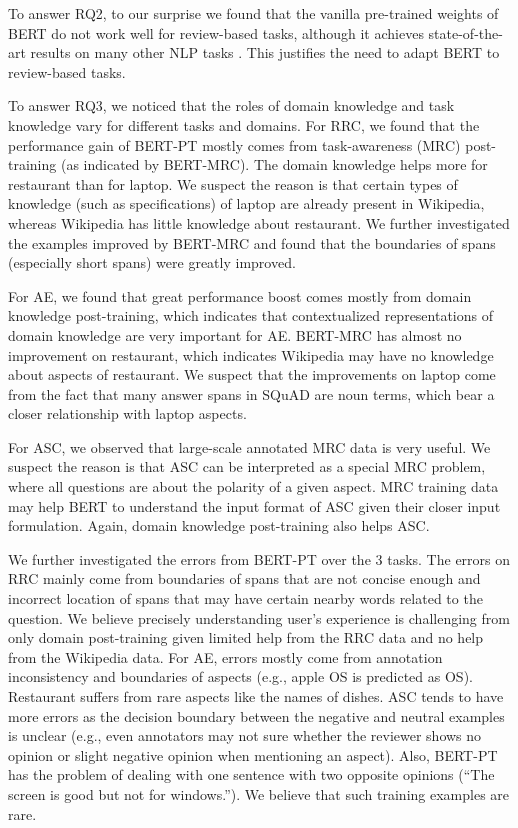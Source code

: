 \documentclass[11pt,a4paper]{article}
\begin{document}
To answer RQ2, to our surprise we found that the vanilla pre-trained weights of BERT do not work well for review-based tasks, although it achieves state-of-the-art results on many other NLP tasks \cite{devlin2018bert}.
This justifies the need to adapt BERT to review-based tasks.

To answer RQ3, we noticed that the roles of domain knowledge and task knowledge vary for different tasks and domains.
For RRC, we found that the performance gain of BERT-PT mostly comes from task-awareness (MRC) post-training (as indicated by BERT-MRC).
The domain knowledge helps more for restaurant than for laptop.
We suspect the reason is that certain types of knowledge (such as specifications) of laptop are already present in Wikipedia, whereas Wikipedia has little knowledge about restaurant.
We further investigated the examples improved by BERT-MRC and found that the boundaries of spans (especially short spans) were greatly improved. 

For AE,
we found that great performance boost comes mostly from domain knowledge post-training, which indicates that contextualized representations of domain knowledge are very important for AE. BERT-MRC has almost no improvement on restaurant, which indicates Wikipedia may have no knowledge about aspects of restaurant.
We suspect that the improvements on laptop come from the fact that many answer spans in SQuAD are noun terms, which bear a closer relationship with laptop aspects.

For ASC, we observed that large-scale annotated MRC data is very useful.
We suspect the reason is that ASC can be interpreted as a special MRC problem, where all questions are about the polarity of a given aspect.
MRC training data may help BERT to understand the input format of ASC given their closer input formulation.
Again, domain knowledge post-training also helps ASC.

We further investigated the errors from BERT-PT over the 3 tasks.
The errors on RRC mainly come from boundaries of spans that are not concise enough and incorrect location of spans that may have certain nearby words related to the question. 
We believe precisely understanding user's experience is challenging from only domain post-training given limited help from the RRC data and no help from the Wikipedia data.
For AE, errors mostly come from annotation inconsistency and boundaries of aspects (e.g., apple OS is predicted as OS). Restaurant suffers from rare aspects like the names of dishes.
ASC tends to have more errors as the decision boundary between the negative and neutral examples is unclear (e.g., even annotators may not sure whether the reviewer shows no opinion or slight negative opinion when mentioning an aspect).
Also, BERT-PT has the problem of dealing with one sentence with two opposite opinions (``The screen is good but not for windows.''). We believe that such training examples are rare.
\end{document}
